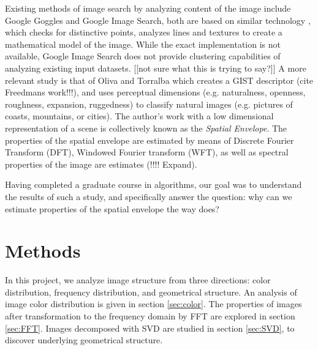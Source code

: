 \documentclass{report}
\begin{document}
Existing methods of image search by analyzing content of the image include Google Goggles and Google Image Search, both are based on similar technology \cite{google_blog}, which checks for distinctive points, analyzes lines and textures to create a mathematical model of the image. {\color{red} While the exact implementation is not available, Google Image Search does not provide clustering capabilities of analyzing existing input datasets. [[not sure what this is trying to say?]]} A more relevant study is that of Oliva and Torralba \cite{gist_descriptor} which creates a GIST descriptor {\color{red}(cite Freedmans work!!!)}, and uses perceptual dimensions (e.g. naturalness, openness, roughness, expansion, ruggedness) to classify natural images (e.g. pictures of coasts, mountains, or cities). The author's work with a low dimensional representation of a scene is collectively known as the \emph{Spatial Envelope}. The properties of the spatial envelope are estimated by means of Discrete Fourier Transform (DFT), Windowed Fourier transform (WFT), as well as spectral properties of the image are estimates {\color{red}(!!!! Expand)}. 

Having completed a graduate course in algorithms, our goal was to understand the results of such a study, and specifically answer the question: why can we estimate properties of the spatial envelope the way \cite{gist_descriptor} does? 


\chapter{Methods}
In this project, we analyze image structure from three directions: color distribution, frequency distribution, and geometrical structure. An analysis of image color distribution is given in section \ref{sec:color}. The properties of images after transformation to the frequency domain by FFT are explored in section \ref{sec:FFT}. Images decomposed with SVD are studied in section \ref{sec:SVD}, to discover underlying geometrical structure.
 
\end{document}
